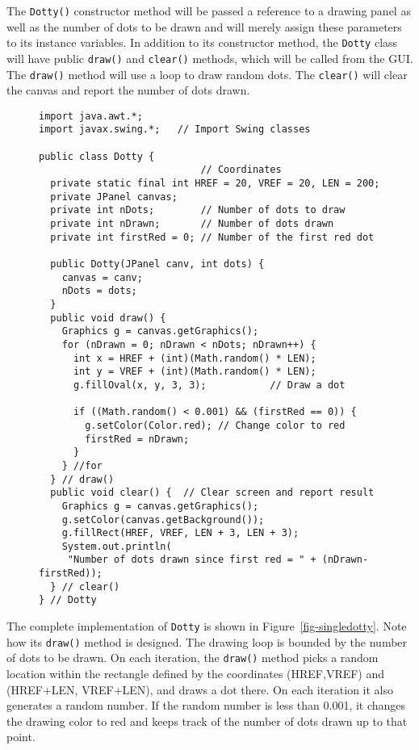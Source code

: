 The {\tt Dotty()} constructor method will be passed a reference to a
drawing panel as well as the number of dots to be drawn and will
merely assign these parameters to its instance variables.   In addition
to its constructor method, the {\tt Dotty} class will have public
{\tt draw()} and {\tt clear()} methods, which will be called from the
GUI.   The {\tt draw()} method will use a loop to draw random
dots.  The {\tt clear()} will clear the canvas and report the
number of dots drawn.

\begin{figure}[h!]
\jjjprogstart
\begin{jjjlisting}[30pc]
\begin{lstlisting}
import java.awt.*;
import javax.swing.*;   // Import Swing classes

public class Dotty {
                            // Coordinates
  private static final int HREF = 20, VREF = 20, LEN = 200; 
  private JPanel canvas;
  private int nDots;        // Number of dots to draw
  private int nDrawn;       // Number of dots drawn
  private int firstRed = 0; // Number of the first red dot

  public Dotty(JPanel canv, int dots) {
    canvas = canv;
    nDots = dots;
  }
  public void draw() {
    Graphics g = canvas.getGraphics();
    for (nDrawn = 0; nDrawn < nDots; nDrawn++) {
      int x = HREF + (int)(Math.random() * LEN);
      int y = VREF + (int)(Math.random() * LEN);
      g.fillOval(x, y, 3, 3);           // Draw a dot

      if ((Math.random() < 0.001) && (firstRed == 0)) {
        g.setColor(Color.red); // Change color to red
        firstRed = nDrawn;
      }
    } //for
  } // draw()
  public void clear() {  // Clear screen and report result
    Graphics g = canvas.getGraphics();
    g.setColor(canvas.getBackground());
    g.fillRect(HREF, VREF, LEN + 3, LEN + 3);
    System.out.println(
     "Number of dots drawn since first red = " + (nDrawn-firstRed));
  } // clear()
} // Dotty
\end{lstlisting}
\end{jjjlisting}
\end{figure}

The complete implementation of {\tt Dotty} is shown in
Figure~\ref{fig-singledotty}. Note how its {\tt draw()} method is
designed.  The drawing loop is bounded by the number of dots to be
drawn.  On each iteration, the {\tt draw()} method picks a
random location within the rectangle defined by the coordinates
(HREF,VREF) and (HREF+LEN, VREF+LEN), and draws a dot there.   On each
iteration it also generates a random number.  If the random number is
less than 0.001, it changes the drawing color to red and keeps track
of the number of dots drawn up to that point.

